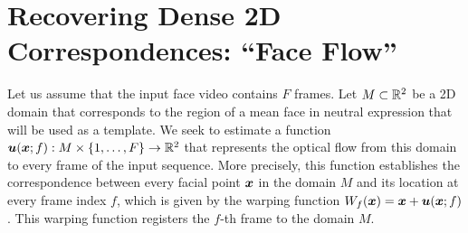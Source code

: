 \section{Recovering Dense 2D Correspondences: ``Face Flow''}\label{sec:face_flow_method}
Let us assume that the input face video contains $F$ frames. Let $M\subset\mathbb{R}^2$
be a 2D domain that corresponds to the region of a mean face in neutral expression
that will be used as a template. We seek to estimate a function
$\boldsymbol{u}(\boldsymbol{x};f) : M\times \{1,\ldots,F\} \rightarrow \mathbb{R}^2$ that represents the
optical flow from this domain to every frame of the input sequence.
More precisely, this function establishes the correspondence between every
facial point $\boldsymbol{x}$ in the domain $M$ and its location at every frame index $f$,
which is given by the warping function $W_f(\boldsymbol{x})=\boldsymbol{x}+\boldsymbol{u}(\boldsymbol{x};f)$. This warping
function registers the $f$-th frame to the domain $M$.

